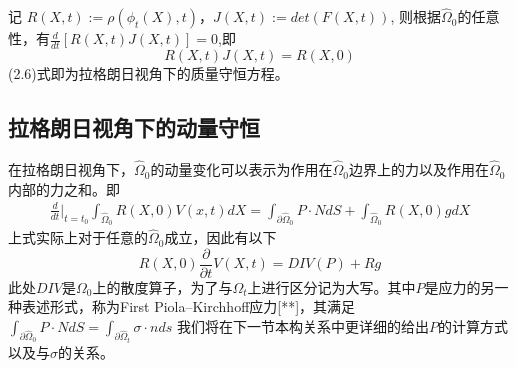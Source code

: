 记 $R(X,t):=\rho(\phi_t(X),t)$，$J(X,t):=det(F(X,t))$, 则根据$\hat{\Omega}_0$的任意性，有$\frac{d}{dt}[R(X,t)J(X,t)] = 0$,即
\begin{equation}
    R(X,t)J(X,t) = R(X,0)
\end{equation}
(2.6)式即为拉格朗日视角下的质量守恒方程。
\subsection{拉格朗日视角下的动量守恒}
在拉格朗日视角下，$\hat{\Omega}_{0}$的动量变化可以表示为作用在$\hat{\Omega}_{0}$边界上的力以及作用在$\hat{\Omega}_{0}$
内部的力之和。即
\begin{equation}
    \begin{split}
        \frac{d}{dt}\Big |_{t = t_0}\int_{\hat{\Omega}_0}R(X,0)V(x,t)dX = \int_{\partial \hat{\Omega}_{0}} P \cdot N dS + \int_{\hat{\Omega}_{0}} R(X,0) g dX
    \end{split}
\end{equation}
上式实际上对于任意的$\hat{\Omega}_0$成立，因此有以下
\begin{equation}
    R(X,0)\frac{\partial}{\partial t} V(X,t) = DIV(P) + Rg
\end{equation}
此处$DIV$是$\Omega_0$上的散度算子，为了与$\Omega_t$上进行区分记为大写。其中$P$是应力的另一种表述形式，称为First Piola–Kirchhoff应力[**]，其满足$\int_{\partial \hat{\Omega}_{0}} P \cdot N dS = \int_{\partial \hat{\Omega}_{t}} \sigma \cdot n ds$
我们将在下一节本构关系中更详细的给出$P$的计算方式以及与$\sigma$的关系。 

